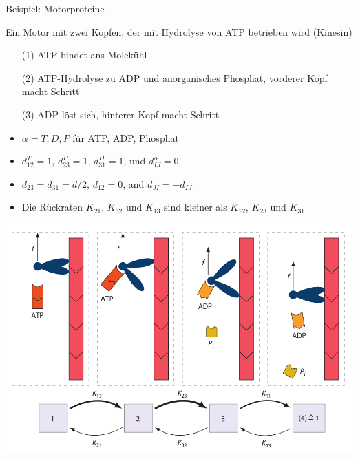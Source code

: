 \documentclass[aspectratio=1610, 9pt]{beamer}
\begin{document}
\begin{frame}{Beispiel: Motorproteine}
  \begin{minipage}{0.38\textwidth}
    Ein Motor mit zwei Kopfen, der mit Hydrolyse von ATP betrieben wird (Kinesin)
    \begin{itemize}
     \item[(1\rightarrow 2)] ATP bindet ans Molekühl
     \item[(2\rightarrow 3)] ATP-Hydrolyse zu ADP und anorganisches Phosphat, vorderer Kopf macht Schritt
     \item[(3\rightarrow 1)] ADP löst sich, hinterer Kopf macht Schritt
    \end{itemize}

    \begin{itemize}
      \item $\alpha= T, D , P$ für ATP, ADP, Phosphat 
      \item $d^T_{12}=1$, $d^P_{23}=1$, $d^D_{31}=1$, und $d^\alpha_{IJ}=0$
      \item $d_{23} = d_{31} = d/2$, $d_{12} = 0$, and $d_{JI} = −d_{IJ}$
      \item Die Rückraten $K_{21}$, $K_{32}$ und $K_{13}$ sind kleiner als $K_{12}$, $K_{23}$ und $K_{31}$
     \end{itemize}

 \end{minipage}
    \begin{minipage}{0.6\textwidth}
      \begin{center}
        \includegraphics[width=\textwidth]{images/motor.png}
      \end{center}
    \end{minipage}
\end{frame}
\end{document}
